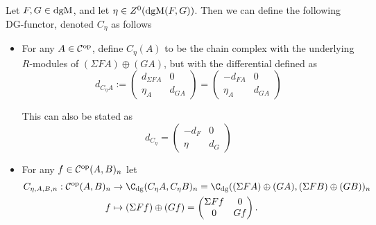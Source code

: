 \begin{definition}
    \label{def:dgm_cone}
    Let \( F, G \in \operatorname{dgM} \), and let \( \eta \in Z^0(\operatorname{dgM}(F, G)) \). Then we can define the following DG-functor, denoted \( C_{\eta} \) as follows
    \begin{itemize}
        \item {
            For any \( A \in {\mathcal{C}}^{\operatorname{op}} \), define \( C_{\eta}(A) \) to be the chain complex with the underlying \( R \)-modules of \( (\Sigma F A) \oplus (G A) \), but with the differential defined as
            \[
                d_{C_{\eta}A} :=
                \begin{pmatrix}
                    d_{\Sigma F A} & 0 \\
                    \eta_A & d_{GA}
                \end{pmatrix}
                =
                \begin{pmatrix}
                    -d_{F A} & 0 \\
                    \eta_A & d_{GA}
                \end{pmatrix}
            \]

            This can also be stated as
            \[
                d_{C_{\eta}} =
                \begin{pmatrix}
                    -d_F & 0 \\
                    \eta & d_G
                \end{pmatrix}
            \]
        }
        \item {
            For any \( f \in {\mathcal{C}}^{\operatorname{op}}(A, B)_n \) let
            \begin{align*}
                C_{\eta, A, B, n}: \Cc^{\op}(A, B)_n &\to \C_{\dg}(C_{\eta} A, C_{\eta} B)_n = \C_{\dg}((\Sigma F A) \oplus (G A), (\Sigma F B) \oplus (G B))_n \\
                f &\mapsto (\Sigma F f) \oplus (G f) =
                \begin{pmatrix}
                    \Sigma F f & 0 \\
                    0 & G f
                \end{pmatrix}.
            \end{align*}
        }
    \end{itemize}
\end{definition}

